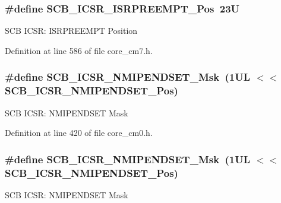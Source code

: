 \subsubsection[{\texorpdfstring{S\+C\+B\+\_\+\+I\+C\+S\+R\+\_\+\+I\+S\+R\+P\+R\+E\+E\+M\+P\+T\+\_\+\+Pos}{SCB_ICSR_ISRPREEMPT_Pos}}]{\setlength{\rightskip}{0pt plus 5cm}\#define S\+C\+B\+\_\+\+I\+C\+S\+R\+\_\+\+I\+S\+R\+P\+R\+E\+E\+M\+P\+T\+\_\+\+Pos~23U}\hypertarget{group___c_m_s_i_s___s_c_b_ga11cb5b1f9ce167b81f31787a77e575df}{}\label{group___c_m_s_i_s___s_c_b_ga11cb5b1f9ce167b81f31787a77e575df}
S\+CB I\+C\+SR\+: I\+S\+R\+P\+R\+E\+E\+M\+PT Position 

Definition at line 586 of file core\+\_\+cm7.\+h.

\subsubsection[{\texorpdfstring{S\+C\+B\+\_\+\+I\+C\+S\+R\+\_\+\+N\+M\+I\+P\+E\+N\+D\+S\+E\+T\+\_\+\+Msk}{SCB_ICSR_NMIPENDSET_Msk}}]{\setlength{\rightskip}{0pt plus 5cm}\#define S\+C\+B\+\_\+\+I\+C\+S\+R\+\_\+\+N\+M\+I\+P\+E\+N\+D\+S\+E\+T\+\_\+\+Msk~(1\+U\+L $<$$<$ S\+C\+B\+\_\+\+I\+C\+S\+R\+\_\+\+N\+M\+I\+P\+E\+N\+D\+S\+E\+T\+\_\+\+Pos)}\hypertarget{group___c_m_s_i_s___s_c_b_ga340e3f79e9c3607dee9f2c048b6b22e8}{}\label{group___c_m_s_i_s___s_c_b_ga340e3f79e9c3607dee9f2c048b6b22e8}
S\+CB I\+C\+SR\+: N\+M\+I\+P\+E\+N\+D\+S\+ET Mask 

Definition at line 420 of file core\+\_\+cm0.\+h.

\subsubsection[{\texorpdfstring{S\+C\+B\+\_\+\+I\+C\+S\+R\+\_\+\+N\+M\+I\+P\+E\+N\+D\+S\+E\+T\+\_\+\+Msk}{SCB_ICSR_NMIPENDSET_Msk}}]{\setlength{\rightskip}{0pt plus 5cm}\#define S\+C\+B\+\_\+\+I\+C\+S\+R\+\_\+\+N\+M\+I\+P\+E\+N\+D\+S\+E\+T\+\_\+\+Msk~(1\+U\+L $<$$<$ S\+C\+B\+\_\+\+I\+C\+S\+R\+\_\+\+N\+M\+I\+P\+E\+N\+D\+S\+E\+T\+\_\+\+Pos)}\hypertarget{group___c_m_s_i_s___s_c_b_ga340e3f79e9c3607dee9f2c048b6b22e8}{}\label{group___c_m_s_i_s___s_c_b_ga340e3f79e9c3607dee9f2c048b6b22e8}
S\+CB I\+C\+SR\+: N\+M\+I\+P\+E\+N\+D\+S\+ET Mask 

